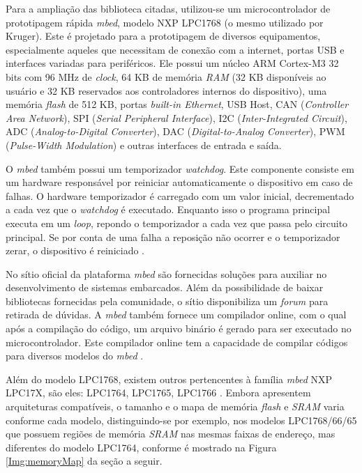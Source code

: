 Para a ampliação das biblioteca citadas, utilizou-se um microcontrolador de prototipagem rápida \textit{mbed}, modelo NXP LPC1768 \cite{lpc1768:2016} (o mesmo utilizado por Kruger). Este é projetado para a prototipagem de diversos equipamentos, especialmente aqueles que necessitam de conexão com a internet, portas USB e interfaces variadas para periféricos. Ele possui um núcleo ARM Cortex-M3 32 bits com 96 MHz de \textit{clock}, 64 KB de memória \textit{RAM} (32 KB disponíveis ao usuário e 32 KB reservados aos controladores internos do dispositivo), uma memória \textit{flash} de 512 KB, portas \textit{built-in Ethernet}, USB Host, CAN (\textit{Controller Area Network}), SPI (\textit{Serial Peripheral Interface}), I2C (\textit{Inter-Integrated Circuit}), ADC (\textit{Analog-to-Digital Converter}), DAC (\textit{Digital-to-Analog Converter}), PWM (\textit{Pulse-Width Modulation}) e outras interfaces de entrada e saída.

O \textit{mbed} também possui um temporizador \textit{watchdog}. Este componente consiste em um hardware responsável por reiniciar automaticamente o dispositivo em caso de falhas. O hardware temporizador é carregado com um valor inicial, decrementado a cada vez que o \textit{watchdog} é executado. Enquanto isso o programa principal executa em um \textit{loop}, repondo o temporizador a cada vez que passa pelo circuito principal. Se por conta de uma falha a reposição não ocorrer e o temporizador zerar, o dispositivo é reiniciado \cite{mbedWhatdog:2016}.

No sítio oficial da plataforma \textit{mbed} são fornecidas soluções para auxiliar no desenvolvimento de sistemas embarcados. Além da possibilidade de baixar bibliotecas fornecidas pela comunidade, o sítio disponibiliza um \textit{forum} para retirada de dúvidas. A \textit{mbed} também fornece um compilador online, com o qual após a compilação do código, um arquivo binário é gerado para ser executado no microcontrolador. Este compilador online tem a capacidade de compilar códigos para diversos modelos do \textit{mbed} \cite{mbedCompiler:2016}.

Além do modelo LPC1768, existem outros pertencentes à família \textit{mbed} NXP LPC17X, são eles: LPC1764, LPC1765, LPC1766 \cite{manualLpc176x:2016}. Embora apresentem arquiteturas compatíveis, o tamanho e o mapa de memória \textit{flash} e \textit{SRAM} varia conforme cada modelo, distinguindo-se por exemplo, nos modelos LPC1768/66/65 que possuem regiões de memória \textit{SRAM} nas mesmas faixas de endereço, mas diferentes do modelo LPC1764, conforme é mostrado na Figura \ref{Img:memoryMap} da seção a seguir.

